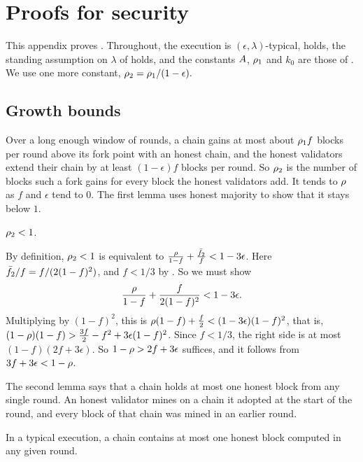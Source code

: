 \section{Proofs for security}
\label{appendix.analysis}

This appendix proves . Throughout,
the execution is $(\epsilon,\lambda)$-typical,  holds, the
standing assumption on $\lambda$ of  holds, and the constants
$A$, $\rho_1$ and $k_0$ are those of . We use one
more constant,
\(
    \rho_2 = \rho_1/(1-\epsilon) .
\)

\subsection{Growth bounds}

Over a long enough window of rounds, a chain gains at most about $\rho_1 f$
blocks per round above its fork point with an honest chain, and the honest
validators extend their chain by at least $(1-\epsilon)f$ blocks per round. So
$\rho_2$ is the number of blocks such a fork gains for every block the honest
validators add. It tends to $\rho$ as $f$ and $\epsilon$ tend to $0$. The
first lemma uses honest majority to show that it stays below $1$.

\begin{lemma}\label{lem.rho}
    $\rho_2<1$.
\end{lemma}

\begin{proofof}{}
    By definition, $\rho_2<1$ is equivalent to
    $\frac{\rho}{1-f}+\frac{\bar{f}_2}{f}<1-3\epsilon$. Here
    $\bar{f}_2/f=f/(2(1-f)^2)$, and $f<1/3$ by . So we must
    show
    \[
        \frac{\rho}{1-f}+\frac{f}{2(1-f)^2} < 1-3\epsilon .
    \]
    Multiplying by $(1-f)^2$, this is
    $\rho(1-f)+\tfrac{f}{2}<(1-3\epsilon)(1-f)^2$, that is,
    $(1-\rho)(1-f)>\tfrac{3f}{2}-f^2+3\epsilon(1-f)^2$. Since $f<1/3$, the
    right side is at most $(1-f)(2f+3\epsilon)$. So $1-\rho>2f+3\epsilon$
    suffices, and it follows from $3f+3\epsilon<1-\rho$.
\end{proofof}

The second lemma says that a chain holds at most one honest block from any
single round. An honest validator mines on a chain it adopted at the start of
the round, and every block of that chain was mined in an earlier round.

\begin{lemma}\label{lem.honestone}
    In a typical execution, a chain contains at most one honest block computed
    in any given round.
\end{lemma}

